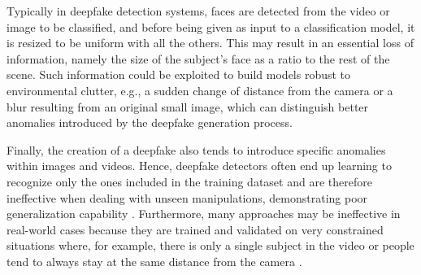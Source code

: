 \documentclass[10pt,twocolumn,letterpaper]{article}
\begin{document}
Typically in deepfake detection systems, faces are detected from the video or image to be classified, and before being given as input to a classification model, it is resized to be uniform with all the others. This may result in an essential loss of information, namely the size of the subject's face as a ratio to the rest of the scene. Such information could be exploited to build models robust to environmental clutter, e.g., a sudden change of distance from the camera or a blur resulting from an original small image, which can distinguish better anomalies introduced by the deepfake generation process.

Finally, the creation of a deepfake also tends to introduce specific anomalies within images and videos. Hence, deepfake detectors often end up learning to recognize only the ones included in the training dataset and are therefore ineffective  when dealing with unseen manipulations, demonstrating poor generalization capability \cite{9156378, 10.1007/978-3-030-58610-2_6, 10.1007/978-3-030-58574-7_7, Haliassos2021LipsDL, Li2020FaceXF, fornow, 10.1145/3512732.3533582}. Furthermore, many approaches may be ineffective in real-world cases because they are trained and validated on very constrained situations where, for example, there is only a single subject in the video or people tend to always stay at the same distance from the camera \cite{wilddeepfake}. 
\end{document}
